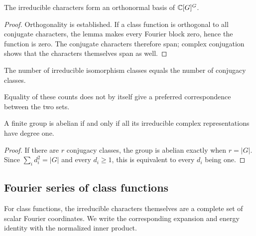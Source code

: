 
\begin{thm}
\label{thm-good-non-commutative-characters}
The irreducible characters form an orthonormal basis of $\mathbb{C}[G]^G$.
\end{thm}
\begin{proof}
Orthogonality is established. If a class function is orthogonal to all
conjugate characters, the lemma makes every Fourier block zero, hence
the function is zero. The conjugate characters therefore span; complex
conjugation shows that the characters themselves span as well.
\end{proof}


\begin{cor}
\label{cor-classes-conjugaisons-representations}
The number of irreducible isomorphism classes equals the number of conjugacy
classes.
\end{cor}
Equality of these counts does not by itself give a preferred correspondence
between the two sets.


\begin{cor}
\label{cor-representations-commutative-grpes}
A finite group is abelian if and only if all its irreducible complex
representations have degree one.
\end{cor}
\begin{proof}
If there are $r$ conjugacy classes, the group is abelian exactly when
$r=|G|$. Since $\sum_i d_i^2=|G|$ and every $d_i\geq1$, this is equivalent
to every $d_i$ being one.
\end{proof}

\subsection{Fourier series of class functions}
\label{sect2-series-fourier}\label{notation-94}

For class functions, the irreducible characters themselves are a complete
set of scalar Fourier coordinates. We write the corresponding expansion and
energy identity with the normalized inner product.

